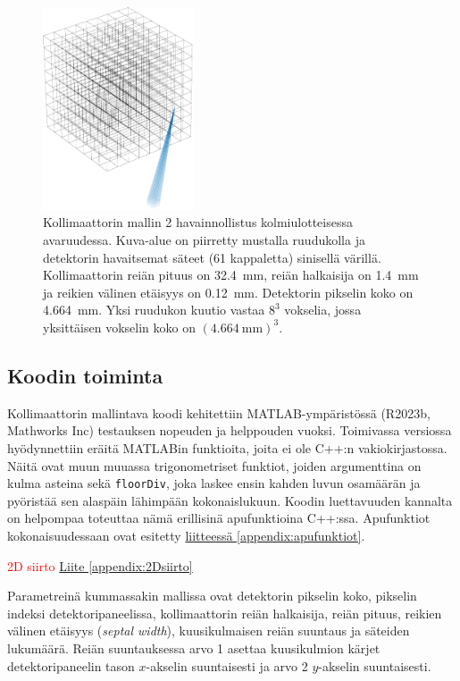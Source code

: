 \begin{figure}[H]
    \centering
    \captionsetup{width=.9\textwidth}
    \includegraphics[height=6cm]{kuvat/3d-kollimaattori2.pdf}
    \caption{Kollimaattorin mallin 2 havainnollistus kolmiulotteisessa avaruudessa. Kuva-alue on piirretty mustalla ruudukolla ja detektorin havaitsemat säteet (61 kappaletta) sinisellä värillä. Kollimaattorin reiän pituus on \qty{32.4}{\milli\meter}, reiän halkaisija on \qty{1.4}{\milli\meter} ja reikien välinen etäisyys on \qty{0.12}{\milli\meter}. Detektorin pikselin koko on \qty{4.664}{\milli\meter}. Yksi ruudukon kuutio vastaa $8^3$ vokselia, jossa yksittäisen vokselin koko on $(\qty{4.664}{\milli\meter})^{3}$.}
    \label{fig:ray3}
\end{figure}

\subsection{Koodin toiminta}
Kollimaattorin mallintava koodi kehitettiin MATLAB-ympäristössä (R2023b, Mathworks Inc) testauksen nopeuden ja helppouden vuoksi. Toimivassa versiossa hyödynnettiin eräitä MATLABin funktioita, joita ei ole C++:n vakiokirjastossa. Näitä ovat muun muuassa trigonometriset funktiot, joiden argumenttina on kulma asteina sekä \texttt{floorDiv}, joka laskee ensin kahden luvun osamäärän ja pyöristää sen alaspäin lähimpään kokonaislukuun. Koodin luettavuuden kannalta on helpompaa toteuttaa nämä erillisinä apufunktioina C++:ssa. Apufunktiot kokonaisuudessaan ovat esitetty \hyperref[appendix:apufunktiot]{liitteessä \ref*{appendix:apufunktiot}}.

\textcolor{red}{2D siirto \hyperref[appendix:2Dsiirto]{Liite \ref*{appendix:2Dsiirto}}}

Parametreinä kummassakin mallissa ovat detektorin pikselin koko, pikselin indeksi detektoripaneelissa, kollimaattorin reiän halkaisija, reiän pituus, reikien välinen etäisyys (\textit{septal width}), kuusikulmaisen reiän suuntaus ja säteiden lukumäärä. Reiän suuntauksessa arvo 1 asettaa kuusikulmion kärjet detektoripaneelin tason $x$-akselin suuntaisesti ja arvo 2 $y$-akselin suuntaisesti.

